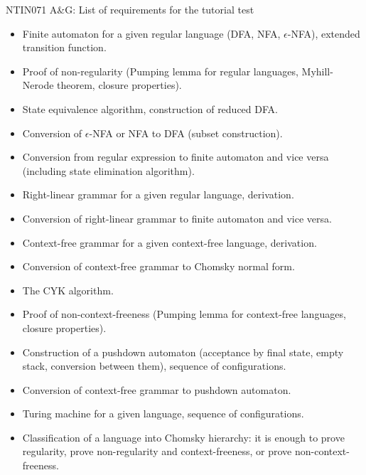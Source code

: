 \documentclass[a4paper,12pt]{article}
\begin{document}
\thispagestyle{empty}

\begin{center}
    \large{NTIN071 A\&G: List of requirements for the tutorial test}    
\end{center}

\bigskip

\begin{itemize}
    \item Finite automaton for a given regular language (DFA, NFA, $\epsilon$-NFA), extended transition function.
    \item Proof of non-regularity (Pumping lemma for regular languages, Myhill-Nerode theorem, closure properties).
    \item State equivalence algorithm, construction of reduced DFA.
    \item Conversion of $\epsilon$-NFA or NFA to DFA (subset construction).
    \item Conversion from regular expression to finite automaton and vice versa (including state elimination algorithm).
    \item Right-linear grammar for a given regular language, derivation.
    \item Conversion of right-linear grammar to finite automaton and vice versa.
    \item Context-free grammar for a given context-free language, derivation.
    \item Conversion of context-free grammar to Chomsky normal form.
    \item The CYK algorithm.
    \item Proof of non-context-freeness (Pumping lemma for context-free languages, closure properties).
    \item Construction of a pushdown automaton (acceptance by final state, empty stack, conversion between them), sequence of configurations.
    \item Conversion of context-free grammar to pushdown automaton.
    \item Turing machine for a given language, sequence of configurations.
    \item Classification of a language into Chomsky hierarchy: it is enough to  prove regularity, prove non-regularity and context-freeness, or prove non-context-freeness.
\end{itemize}
\end{document}

